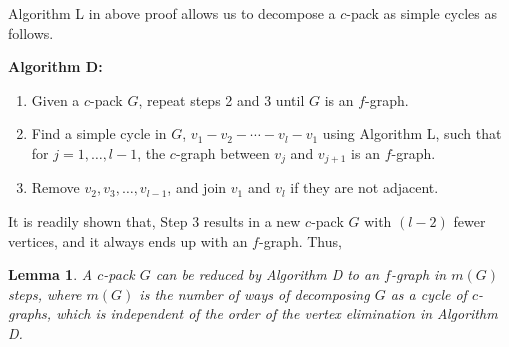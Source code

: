 \documentclass[preprint]{revtex4-1}
\newtheorem{lemm}[thrm]{Lemma}
\begin{document}
Algorithm L in above proof allows us to
  decompose a $c$-pack as simple cycles as follows.

\textbf{Algorithm D:}
\begin{enumerate}
  \item
    Given a $c$-pack $G$,
      repeat steps 2 and 3 until $G$ is an $f$-graph.
  \item
    Find a simple cycle in $G$,
      $v_1 - v_2 - \cdots - v_l - v_1$
      using Algorithm L,
      such that
      for $j = 1, \dots, l-1$,
      the $c$-graph between $v_j$ and $v_{j+1}$
      is an $f$-graph.
  \item
    Remove $v_2, v_3, \dots, v_{l-1}$,
      and join $v_1$ and $v_l$ if they are not adjacent.
\end{enumerate}
%
It is readily shown that,
  Step 3 results in a new $c$-pack $G$
  with $(l - 2)$ fewer vertices,
  and it always ends up with an $f$-graph.
%
Thus,


\begin{lemm}
  A $c$-pack $G$ can be reduced
    by Algorithm D to an $f$-graph in $m(G)$ steps,
    where $m(G)$ is the number of ways of decomposing
    $G$ as a cycle of $c$-graphs,
    which is independent of the order of the vertex elimination
    in Algorithm D.
\label{thm:hncdecomp}
\end{lemm}
\end{document}
